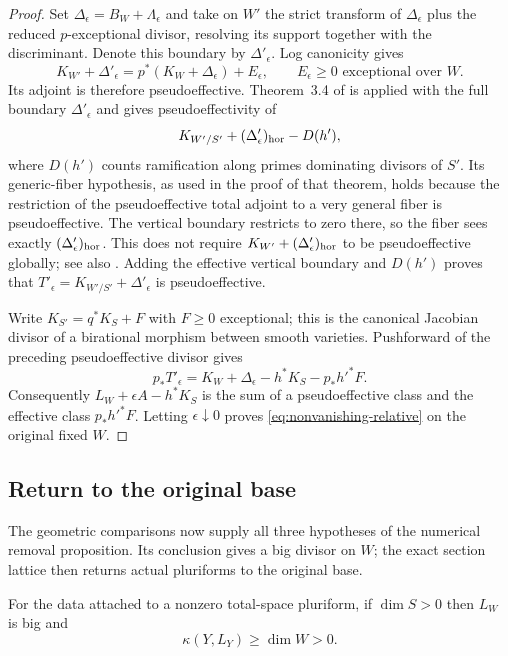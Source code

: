 \begin{proof}
Set $\Delta_\epsilon=B_W+\Lambda_\epsilon$ and take on $W'$ the
strict transform of $\Delta_\epsilon$ plus the reduced
$p$-exceptional divisor, resolving its support together with the
discriminant.  Denote this boundary by $\Delta'_\epsilon$.  Log
canonicity gives
\[
 K_{W'}+\Delta'_\epsilon
     =p^*(K_W+\Delta_\epsilon)+E_\epsilon,
               \qquad E_\epsilon\ge0
               \text{ exceptional over }W.
\]
Its adjoint is therefore pseudoeffective.  Theorem~3.4 of \cite{CP}
is applied with the full boundary $\Delta'_\epsilon$ and gives
pseudoeffectivity of
\[
 K_{W'/S'}+(\Delta'_\epsilon)_{\rm hor}-D(h'),
\]
where $D(h')$ counts ramification along primes dominating divisors of
$S'$.  Its generic-fiber hypothesis, as used in the proof of that
theorem, holds because the restriction of the pseudoeffective total
adjoint to a very general fiber is pseudoeffective.  The vertical
boundary restricts to zero there, so the fiber sees exactly
$(\Delta'_\epsilon)_{\rm hor}$.  This does not require
$K_{W'}+(\Delta'_\epsilon)_{\rm hor}$ to be pseudoeffective globally;
see also \cite[Remark~3.6]{CP}.
Adding the effective vertical boundary and $D(h')$ proves that
$T'_\epsilon=K_{W'/S'}+\Delta'_\epsilon$ is pseudoeffective.

Write $K_{S'}=q^*K_S+F$ with $F\ge0$ exceptional; this is the
canonical Jacobian divisor of a birational morphism between smooth
varieties.  Pushforward of the preceding pseudoeffective divisor gives
\[
 p_*T'_\epsilon
   =K_W+\Delta_\epsilon-h^*K_S-p_*h'^*F.
\]
Consequently $L_W+\epsilon A-h^*K_S$ is the sum of a
pseudoeffective class and the effective class $p_*h'^*F$.
Letting $\epsilon\downarrow0$ proves
\eqref{eq:nonvanishing-relative} on the original fixed $W$.
\end{proof}

\subsection{Return to the original base}

The geometric comparisons now supply all three hypotheses of the
numerical removal proposition.  Its conclusion gives a big divisor
on $W$; the exact section lattice then returns actual pluriforms to
the original base.

\begin{proposition}\label{prop:positive-period}
For the data attached to a nonzero total-space pluriform, if
$\dim S>0$ then $L_W$ is big and
\[
                      \kappa(Y,L_Y)\ge\dim W>0.
\]
\end{proposition}

